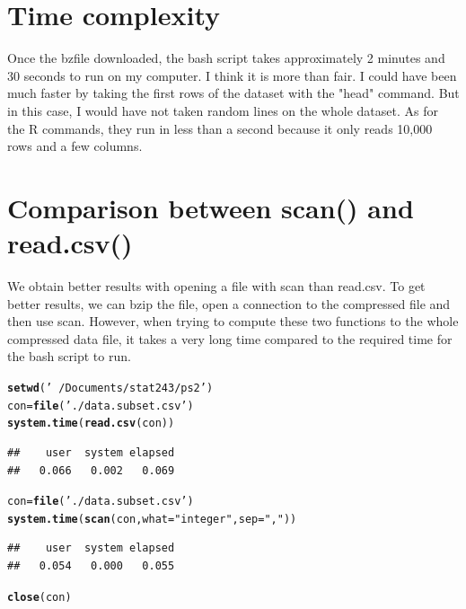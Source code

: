 \documentclass{llncs}\usepackage[]{graphicx}\usepackage[]{color}
\makeatletter
\newcommand{\hlstr}[1]{\textcolor[rgb]{0.192,0.494,0.8}{#1}}%
\newcommand{\hlstd}[1]{\textcolor[rgb]{0.345,0.345,0.345}{#1}}%
\newcommand{\hlkwb}[1]{\textcolor[rgb]{0.69,0.353,0.396}{#1}}%
\newcommand{\hlkwc}[1]{\textcolor[rgb]{0.333,0.667,0.333}{#1}}%
\newcommand{\hlkwd}[1]{\textcolor[rgb]{0.737,0.353,0.396}{\textbf{#1}}}%
\newenvironment{kframe}{%
 \def\at@end@of@kframe{}%
 \ifinner\ifhmode%
  \def\at@end@of@kframe{\end{minipage}}%
  \begin{minipage}{\columnwidth}%
 \fi\fi%
 \def\FrameCommand##1{\hskip\@totalleftmargin \hskip-\fboxsep
 \colorbox{shadecolor}{##1}\hskip-\fboxsep
     \hskip-\linewidth \hskip-\@totalleftmargin \hskip\columnwidth}%
 \MakeFramed {\advance\hsize-\width
   \@totalleftmargin\z@ \linewidth\hsize
   \@setminipage}}%
 {\par\unskip\endMakeFramed%
 \at@end@of@kframe}
\newenvironment{knitrout}{}{} %
\makeatother
\begin{document}
\section{Time complexity}
Once the bzfile downloaded, the bash script takes approximately 2 minutes and 30 seconds to run on my computer. I think it is more than fair. I could have been much faster by taking the first rows of the dataset with the "head" command. But in this case, I would have not taken random lines on the whole dataset.
As for the R commands, they run in less than a second because it only reads 10,000 rows and a few columns.

\section{Comparison between scan() and read.csv()}
We obtain better results with opening a file with scan than read.csv. To get better results, we can bzip the file, open a connection to the compressed file and then use scan. However, when trying to compute these two functions to the whole compressed data file, it takes a very long time compared to the required time for the bash script to run.
\begin{knitrout}
\color{fgcolor}\begin{kframe}
\begin{alltt}
\hlkwd{setwd}\hlstd{(}\hlstr{'~/Documents/stat243/ps2'}\hlstd{)}
\hlstd{con}\hlkwb{=}\hlkwd{file}\hlstd{(}\hlstr{'./data.subset.csv'}\hlstd{)}
\hlkwd{system.time}\hlstd{(}\hlkwd{read.csv}\hlstd{(con))}
\end{alltt}
\begin{verbatim}
##    user  system elapsed 
##   0.066   0.002   0.069
\end{verbatim}
\begin{alltt}
\hlstd{con}\hlkwb{=}\hlkwd{file}\hlstd{(}\hlstr{'./data.subset.csv'}\hlstd{)}
\hlkwd{system.time}\hlstd{(}\hlkwd{scan}\hlstd{(con,}\hlkwc{what}\hlstd{=}\hlstr{"integer"}\hlstd{,}\hlkwc{sep}\hlstd{=}\hlstr{","}\hlstd{))}
\end{alltt}
\begin{verbatim}
##    user  system elapsed 
##   0.054   0.000   0.055
\end{verbatim}
\begin{alltt}
\hlkwd{close}\hlstd{(con)}
\end{alltt}
\end{kframe}
\end{knitrout}
\end{document}
